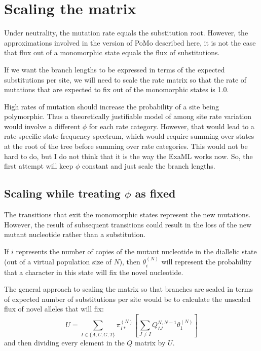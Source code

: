 \documentclass{llncs}
\newcommand{\polyProb}{\ensuremath{\phi}}
\newcommand{\pomo}{PoMo\xspace}
\begin{document}
\section{Scaling the matrix}
Under neutrality, the mutation rate equals the substitution root.
However, the approximations involved in the version of \pomo described here, 
    it is not the case that flux out of a monomorphic state equals the flux
    of substitutions.

If we want the branch lengths to be expressed in terms of the expected substitutions
    per site, we will need to scale the rate matrix so that the
    rate of mutations that are expected to fix out of the 
    monomorphic states is 1.0.

High rates of mutation should increase the probability of a site being polymorphic.
Thus a theoretically justifiable model of among site rate variation would involve
    a different $\polyProb$ for each rate category.
However, that would lead to a rate-specific state-frequency spectrum, which would
    require summing over states at the root of the tree before summing over rate 
    categories.
This would not be hard to do, but I do not think that it is the way the ExaML works now.
So, the first attempt will keep $\polyProb$ constant and just scale the branch lengths.

\subsection{Scaling while treating $\polyProb$ as fixed}
The transitions that exit the monomorphic states represent the new mutations.
However, the result of subsequent transitions could result in the loss of the 
    new mutant nucleotide rather than a substitution.


If $i$ represents the number of copies of the mutant nucleotide in the diallelic
state (out of a virtual population size of $N$), then $\theta_i^{(N)}$ will
represent the probability that a character in this 
state will fix the novel nucleotide.

The general approach to scaling the matrix so that branches are scaled in terms of
    expected number of substitutions per site would be to calculate the unscaled
    flux of novel alleles that will fix:
\begin{equation}
U = \sum_{I \in \{A,C,G,T\}}\pi_{I\ast}^{(N)}\left[\sum_{J\neq I}Q_{IJ}^{N,N-1}\theta_1^{(N)}\right]
\end{equation}
and then dividing every element in the $Q$ matrix by $U$.
\end{document}

